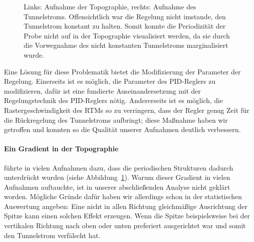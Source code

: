 \begin{figure}[h]
\begin{subfigure}[b]{\picwidth}
    \end{subfigure}
    \caption{Links: Aufnahme der Topographie, rechts: Aufnahme des Tunnelstroms.
    Offensichtlich war die Regelung nicht imstande, den Tunnelstrom konstant zu halten. 
    Somit konnte die Periodizität der Probe nicht auf in der Topographie visualisiert werden,
    da sie durch die Vorwegnahme des nicht konstanten Tunnelstroms marginalisiert wurde.}
    \label{fig:fehler1}
\end{figure}

Eine Lösung für diese Problematik bietet die Modifizierung der Parameter der Regelung. 
Einerseits ist es möglich, die Parameter des PID-Reglers zu modifizieren, dafür
ist eine fundierte Auseinandersetzung mit der Regelungstechnik des PID-Reglers nötig.
Andererseits ist es möglich, die Rastergeschwindigkeit des RTMs so zu verringern, dass der
Regler genug Zeit für die Rückregelung des Tunnelstroms aufbringt; diese Maßnahme haben wir 
getroffen und konnten so die Qualität unserer Aufnahmen deutlich verbessern.
\paragraph{Ein Gradient in der Topographie} führte in vielen Aufnahmen
dazu, dass die periodischen Strukturen dadurch unterdrückt wurden (siehe Abbildung~\ref{fig:fehler1}).
Warum dieser Gradient in vielen Aufnahmen auftauchte, ist in unserer abschließenden Analyse
nicht geklärt worden. Mögliche Gründe dafür haben wir allerdings schon in der statistischen Auswertung
angeben: Eine nicht in allen Richtung gleichmäßige Ausrichtung der Spitze kann einen solchen
Effekt erzeugen. Wenn die Spitze beispielsweise 
bei der vertikalen Richtung nach oben oder unten preferiert ausgerichtet
war und somit den Tunnelstrom verfälscht hat.
